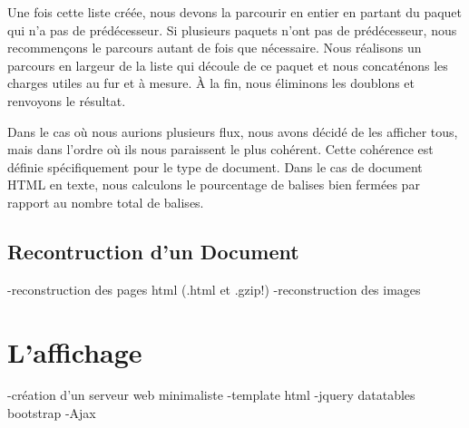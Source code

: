 Une fois cette liste créée, nous devons la parcourir en entier en partant du paquet qui n'a pas de prédécesseur. Si plusieurs paquets n'ont pas de prédécesseur, nous recommençons le parcours autant de fois que nécessaire. Nous réalisons un parcours en largeur de la liste qui découle de ce paquet et nous concaténons les charges utiles au fur et à mesure. À la fin, nous éliminons
 les doublons et renvoyons le résultat.



Dans le cas où nous aurions plusieurs flux, nous avons décidé de les afficher tous, mais dans l'ordre où ils nous paraissent le plus cohérent. Cette cohérence est définie spécifiquement 
pour le type de document. Dans le cas de document HTML en texte, nous calculons le pourcentage de balises bien fermées par rapport au nombre total de balises.

\subsection{Recontruction d'un Document}

-reconstruction des pages html (.html et .gzip!)
-reconstruction des images

\section{L'affichage}
-création d'un serveur web minimaliste
-template html
-jquery datatables bootstrap
-Ajax

